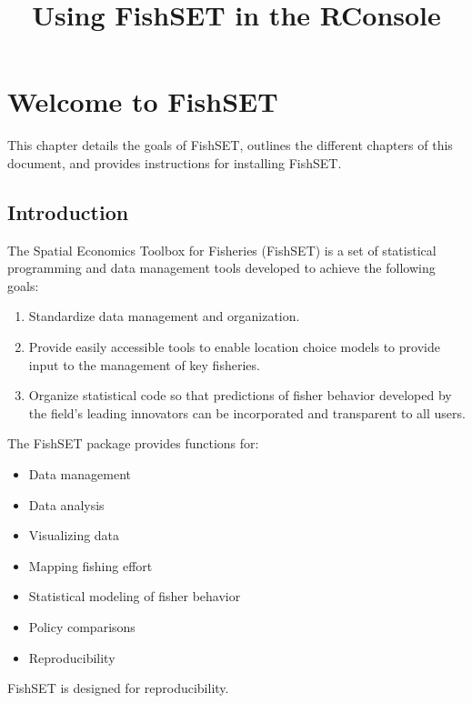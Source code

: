 \documentclass[
]{article}
\title{Using FishSET in the RConsole}
\author{}
\date{\vspace{-2.5em}}
\providecommand{\tightlist}{%
  \setlength{\itemsep}{0pt}\setlength{\parskip}{0pt}}
\begin{document}
\maketitle

{
\setcounter{tocdepth}{2}
\tableofcontents
}
\hypertarget{welcome-to-fishset}{%
\section{Welcome to FishSET}\label{welcome-to-fishset}}

This chapter details the goals of FishSET, outlines the different chapters of this document, and provides instructions for installing FishSET.

\hypertarget{introduction}{%
\subsection{Introduction}\label{introduction}}

The Spatial Economics Toolbox for Fisheries (FishSET) is a set of statistical programming and data management tools developed to achieve the following goals:

\begin{enumerate}
\def\labelenumi{\arabic{enumi}.}
\item
  Standardize data management and organization.
\item
  Provide easily accessible tools to enable location choice models to provide input to the management of key fisheries.
\item
  Organize statistical code so that predictions of fisher behavior developed by the field's leading innovators can be incorporated and transparent to all users.
\end{enumerate}

The FishSET package provides functions for:

\begin{itemize}
\tightlist
\item
  Data management
\item
  Data analysis
\item
  Visualizing data
\item
  Mapping fishing effort
\item
  Statistical modeling of fisher behavior
\item
  Policy comparisons
\item
  Reproducibility
\end{itemize}

FishSET is designed for reproducibility.
\end{document}
